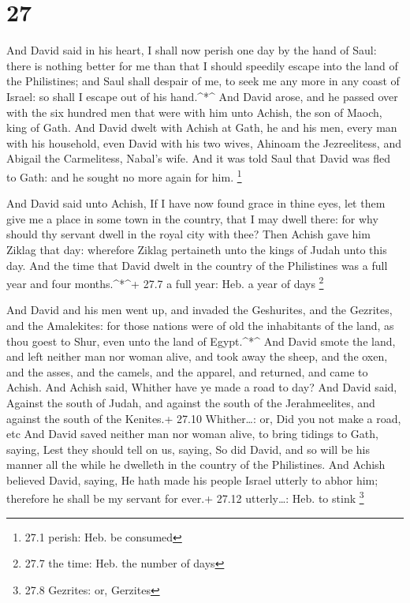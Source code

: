 \hypertarget{section-26}{%
\section{27}\label{section-26}}

 And David said in his heart, I shall now perish one day by
the hand of Saul: there is nothing better for me than that I should
speedily escape into the land of the Philistines; and Saul shall despair
of me, to seek me any more in any coast of Israel: so shall I escape out
of his hand.\^{}*\^{}  And David arose, and he passed over
with the six hundred men that were with him unto Achish, the son of
Maoch, king of Gath.  And David dwelt with Achish at Gath,
he and his men, every man with his household, even David with his two
wives, Ahinoam the Jezreelitess, and Abigail the Carmelitess, Nabal's
wife.  And it was told Saul that David was fled to Gath: and
he sought no more again for him. \footnote{27.1 perish: Heb. be consumed}

 And David said unto Achish, If I have now found grace in
thine eyes, let them give me a place in some town in the country, that I
may dwell there: for why should thy servant dwell in the royal city with
thee?  Then Achish gave him Ziklag that day: wherefore
Ziklag pertaineth unto the kings of Judah unto this day. 
And the time that David dwelt in the country of the Philistines was a
full year and four months.\^{}*\^{}+ 27.7 a full year: Heb. a year of
days \footnote{27.7 the time: Heb. the number of days}

 And David and his men went up, and invaded the Geshurites,
and the Gezrites, and the Amalekites: for those nations were of old the
inhabitants of the land, as thou goest to Shur, even unto the land of
Egypt.\^{}*\^{}  And David smote the land, and left neither
man nor woman alive, and took away the sheep, and the oxen, and the
asses, and the camels, and the apparel, and returned, and came to
Achish.  And Achish said, Whither have ye made a road to
day? And David said, Against the south of Judah, and against the south
of the Jerahmeelites, and against the south of the Kenites.+ 27.10
Whither\ldots: or, Did you not make a road, etc  And David
saved neither man nor woman alive, to bring tidings to Gath, saying,
Lest they should tell on us, saying, So did David, and so will be his
manner all the while he dwelleth in the country of the Philistines.
 And Achish believed David, saying, He hath made his people
Israel utterly to abhor him; therefore he shall be my servant for ever.+
27.12 utterly\ldots: Heb. to stink \footnote{27.8 Gezrites: or, Gerzites}

